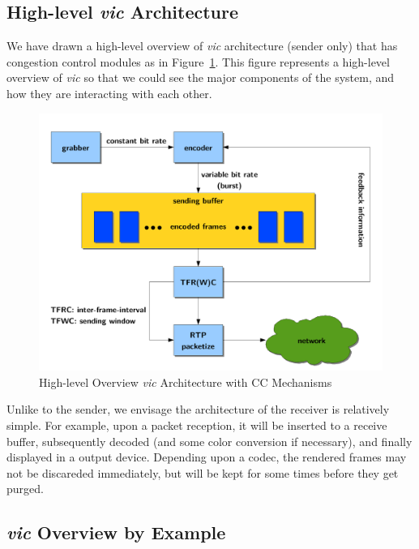
\subsection{\label{ssec:high-arch}High-level \emph{vic} Architecture}

We have drawn a high-level overview of \emph{vic} architecture (sender only)
that has congestion control modules as in Figure~\ref{fig:high-vic-arch}. This
figure represents a high-level overview of \emph{vic} so that we could see the
major components of the system, and how they are interacting with each other. 

\vspace{1cm}

\begin{figure}[!h]
\begin{center}
\includegraphics[scale=.5]{./img/high-vic-arch}
\caption{\label{fig:high-vic-arch}High-level Overview \emph{vic} Architecture 
with CC Mechanisms}
\end{center}
\end{figure}

Unlike to the sender, we envisage the architecture of the receiver is relatively
simple. For example, upon a packet reception, it will be inserted to a receive
buffer, subsequently decoded (and some color conversion if necessary), and
finally displayed in a output device. Depending upon a codec, the rendered
frames may not be discareded immediately, but will be kept for some times before
they get purged.

\subsection{\label{ssec:vic-overview}\emph{vic} Overview by Example}

